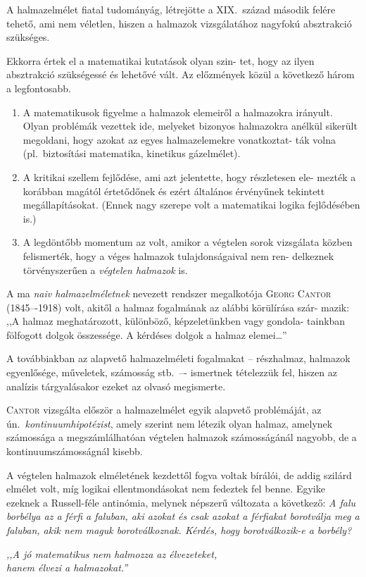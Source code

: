 \documentclass[a4paper,12pt]{article}
\begin{document}
A halmazelmélet fiatal tudományág, létrejötte a XIX.~század második
felére tehető, ami nem véletlen, hiszen a halmazok vizsgálatához nagyfokú
absztrakció szükséges.

Ekkorra értek el a matematikai kutatások olyan szin-
tet, hogy az ilyen absztrakció szükségessé és lehetővé vált. Az előzmények
közül a következő három a legfontosabb.

\begin{enumerate}
\item A matematikusok figyelme a halmazok elemeiről a halmazokra irányult.
Olyan problémák vezettek ide, melyeket bizonyos halmazokra anélkül
sikerült megoldani, hogy azokat az egyes halmazelemekre vonatkoztat-
ták volna (pl.~biztosítási matematika, kinetikus gázelmélet).

\item A kritikai szellem fejlődése, ami azt jelentette, hogy részletesen ele-
mezték a korábban magától értetődőnek és ezért általános érvényűnek
tekintett megállapításokat. (Ennek nagy szerepe volt a matematikai
logika fejlődésében is.)

\item A legdöntőbb momentum az volt, amikor a végtelen sorok vizsgálata
közben felismerték, hogy a véges halmazok tulajdonságaival nem ren-
delkeznek törvényszerűen a \emph{végtelen halmazok} is.
\end{enumerate}

A ma \emph{naiv halmazelméletnek} nevezett rendszer megalkotója \textsc{Georg Cantor}
(1845–-1918) volt, akitől a halmaz fogalmának az alábbi körülírása szár-
mazik: ,,A halmaz meghatározott, különböző, képzeletünkben vagy gondola-
tainkban fölfogott dolgok összessége. A kérdéses dolgok a halmaz elemei\dots''

A továbbiakban az alapvető halmazelméleti fogalmakat -- részhalmaz, halmazok
egyenlősége, műveletek, számosság stb.~–- ismertnek tételezzük fel, hiszen
az analízis tárgyalásakor ezeket az olvasó megismerte.

\textsc{Cantor} vizsgálta először a halmazelmélet egyik alapvető problémáját, az
ún.~\emph{kontinuumhipotézist}, amely szerint nem létezik olyan halmaz, amelynek
számossága a megszámlálhatóan végtelen halmazok számosságánál nagyobb,
de a kontinuumszámosságnál kisebb.

\bigskip
A végtelen halmazok elméletének kezdettől fogva voltak bírálói, de addig
szilárd elmélet volt, míg logikai ellentmondásokat nem fedeztek fel benne.
Egyike ezeknek a Russell-féle antinómia, melynek népszerű változata a következő:
\emph{A falu borbélya az a férfi a faluban, aki azokat és csak azokat a
férfiakat borotválja meg a faluban, akik nem maguk borotválkoznak. Kérdés,
hogy borotválkozik-e a borbély?}

\begin{flushright}
\emph{,,A jó matematikus nem halmozza az élvezeteket,\\hanem élvezi a halmazokat.''}
\end{flushright}
\end{document}
